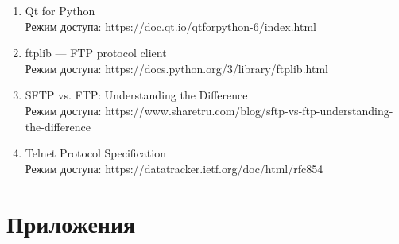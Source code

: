 \documentclass[a4paper,14pt]{extarticle}
\begin{document}
\begin{enumerate}
    \item Qt for Python \\Режим доступа: https://doc.qt.io/qtforpython-6/index.html
    \item ftplib — FTP protocol client \\Режим доступа: https://docs.python.org/3/library/ftplib.html
    \item SFTP vs. FTP: Understanding the Difference \\Режим доступа: https://www.sharetru.com/blog/sftp-vs-ftp-understanding-the-difference
    \item Telnet Protocol Specification \\Режим доступа: https://datatracker.ietf.org/doc/html/rfc854
\end{enumerate}

\newpage

\section{Приложения}
\end{document}
